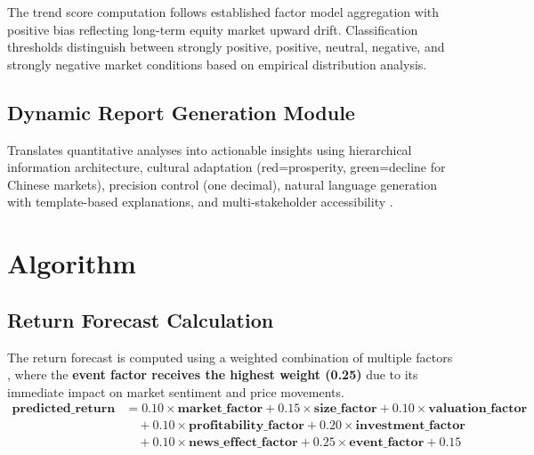 \documentclass[3p,times,procedia]{elsarticle}
\begin{document}
The trend score computation follows established factor model aggregation with positive bias reflecting long-term equity market upward drift. Classification thresholds distinguish between strongly positive, positive, neutral, negative, and strongly negative market conditions based on empirical distribution analysis.

\subsection{Dynamic Report Generation Module}

Translates quantitative analyses into actionable insights using hierarchical information architecture, cultural adaptation (red=prosperity, green=decline for Chinese markets), precision control (one decimal), natural language generation with template-based explanations, and multi-stakeholder accessibility \cite{Ribeiro2016,Harvey2016}.

\section{Algorithm}

\subsection{Return Forecast Calculation}
The return forecast is computed using a weighted combination of multiple factors \cite{FAMA1993}, where the \textbf{event factor receives the highest weight (0.25)} due to its immediate impact on market sentiment and price movements.
\begin{align}
\mathbf{predicted\_return} &= 0.10 \times \mathbf{market\_factor} + 0.15 \times \mathbf{size\_factor} + 0.10 \times \mathbf{valuation\_factor} \nonumber \\
&\quad + 0.10 \times \mathbf{profitability\_factor} + 0.20 \times \mathbf{investment\_factor} \nonumber \\
&\quad + 0.10 \times \mathbf{news\_effect\_factor} + 0.25 \times \mathbf{event\_factor} + 0.15
\end{align}
\end{document}

